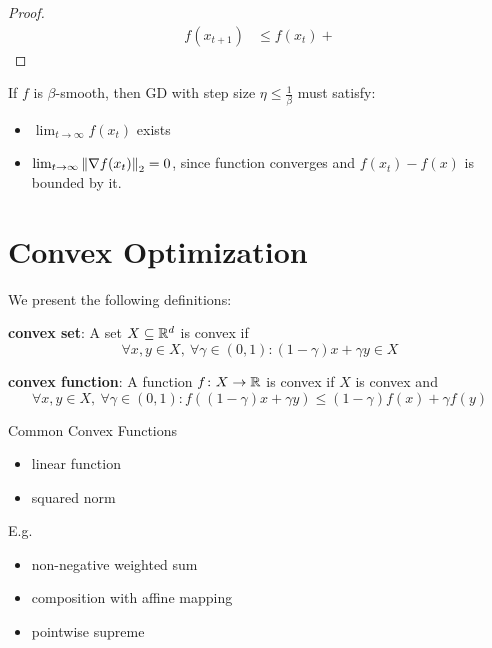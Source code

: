 \begin{proof}
    \begin{align*}
        f(x_{t+1}) &\leq f(x_t) +
    \end{align*}
\end{proof}


\begin{corollary}
    If \(f\) is \(\beta\)-smooth, then GD with step size \(\eta \leq \frac{1}{\beta}\) must 
    satisfy: 
    \begin{itemize}
        \item \(\lim_{t \to \infty} f(x_t)\) exists 
        \item \(\lim_{t \to \infty} \norm{\nabla f(x_t)}_2 = 0\), since function converges and 
        \(f(x_t) - f(x)\) is bounded by it. 
    \end{itemize}
\end{corollary}

\section{Convex Optimization}

\begin{definition}[convexity] We present the following definitions: 
    
    \textbf{convex set}: A set \(X \subseteq \mathbb{R}^d\) is convex if 
    \[
        \forall x, y \in X, \ \forall \gamma \in (0,1) \colon (1 - \gamma)x + \gamma y \in X   
    \]

    \textbf{convex function}: A function \(f \colon X \to \mathbb{R}\) is convex if \(X\) is convex 
    and 
    \[
        \forall x, y \in X, \ \forall \gamma \in (0,1) \colon 
        f \left((1 - \gamma)x + \gamma y\right) \leq (1 - \gamma) f(x) + \gamma f(y)
    \]
\end{definition}

\begin{eg} Common Convex Functions 

    \begin{itemize}
        \item linear function 
        \item squared norm
    \end{itemize}
    
\end{eg}

\begin{eg} E.g. 


    \begin{itemize}
        \item non-negative weighted sum 
        \item composition with affine mapping 
        \item pointwise supreme 
    \end{itemize}
\end{eg}


